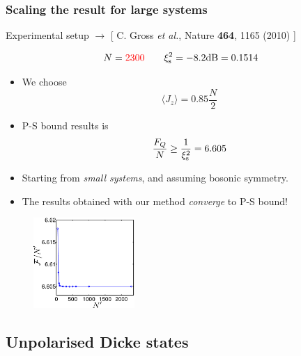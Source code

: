\documentclass{beamer}
\newcommand{\expect}[1]{\ensuremath{\langle #1 \rangle}}
\newcommand{\citate}[1]{{\footnotesize{\color{gray}[ #1 ]}}

	}
\begin{document}
		\begin{frame}
			\frametitle{Scaling the result for large systems}

			{\small Experimental setup $\rightarrow$ \citate{C. Gross {\it et al.}, Nature {\bf 464}, 1165 (2010)}}
				\begin{block}
					{}
					\[
					N = {\color{red}2300}\qquad \xi^2_{\rm s} =-8.2{\rm dB}=0.1514
					\]
					\vspace{-12px}
				\end{block}
				\begin{itemize}
					\item<2-> We choose
					\[ \expect{J_z} = 0.85 \frac{N}{2}
					\]
					\item<2-> P-S bound results is
					\[
					\frac{F_Q}{N} \geq \frac{1}{\xi_{\rm s}^2} = 6.605
					\]
				\end{itemize}
		\end{frame}

		\begin{frame}

			\begin{itemize}
				\item Starting from \emph{\color{blue}small systems}, and assuming bosonic symmetry.
				\vspace{5px}
				\item The results obtained with our method \emph{\color{blue}converge} to P-S bound!
			\end{itemize}
			\begin{figure}
				\includegraphics[height=130px]{img/scaling-spsq.pdf}
			\end{figure}

		\end{frame}

	\subsection{Unpolarised Dicke states}
\end{document}
